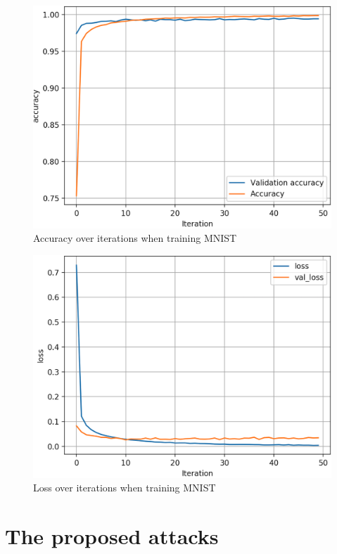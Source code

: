 \documentclass[12pt]{article}
\begin{document}
\begin{figure}[H]
	\centering
	\caption{Accuracy over iterations when training MNIST}
		\label{fig:MNIST-accuracy}
	\vspace{2mm}
	\includegraphics[scale=0.3]{img/MNIST_accuracy}
\end{figure}

\begin{figure}[H]
	\centering
	\caption{Loss over iterations when training MNIST}
		\label{fig:MNIST-loss}
	\vspace{2mm}
	\includegraphics[scale=0.3]{img/MNIST_loss}
\end{figure}


\section{The proposed attacks}
\end{document}
